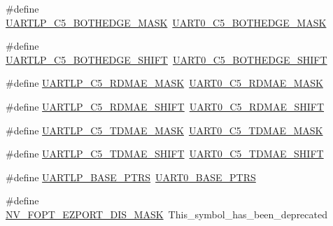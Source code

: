 \begin{DoxyCompactItemize}
\item 
\#define \hyperlink{group___backward___compatibility___symbols_ga6b248448b3fc7bf345c7a75bec3b8aa3}{U\+A\+R\+T\+L\+P\+\_\+\+C5\+\_\+\+B\+O\+T\+H\+E\+D\+G\+E\+\_\+\+M\+A\+SK}~\hyperlink{group___u_a_r_t0___register___masks_gaa34159b3052095ce96fa50cc6183de77}{U\+A\+R\+T0\+\_\+\+C5\+\_\+\+B\+O\+T\+H\+E\+D\+G\+E\+\_\+\+M\+A\+SK}
\item 
\#define \hyperlink{group___backward___compatibility___symbols_gac6b4dfae8e6dc532807323db5e2e489c}{U\+A\+R\+T\+L\+P\+\_\+\+C5\+\_\+\+B\+O\+T\+H\+E\+D\+G\+E\+\_\+\+S\+H\+I\+FT}~\hyperlink{group___u_a_r_t0___register___masks_ga7d1df71b9671df4f50ecb6c1e1518731}{U\+A\+R\+T0\+\_\+\+C5\+\_\+\+B\+O\+T\+H\+E\+D\+G\+E\+\_\+\+S\+H\+I\+FT}
\item 
\#define \hyperlink{group___backward___compatibility___symbols_ga8b81dfd26f766f55a3c80110e5439652}{U\+A\+R\+T\+L\+P\+\_\+\+C5\+\_\+\+R\+D\+M\+A\+E\+\_\+\+M\+A\+SK}~\hyperlink{group___u_a_r_t0___register___masks_ga75704957ea817d0ea4ef69975008dae1}{U\+A\+R\+T0\+\_\+\+C5\+\_\+\+R\+D\+M\+A\+E\+\_\+\+M\+A\+SK}
\item 
\#define \hyperlink{group___backward___compatibility___symbols_gabf5bb3ff2b944bfdbfd8b05f29c7b678}{U\+A\+R\+T\+L\+P\+\_\+\+C5\+\_\+\+R\+D\+M\+A\+E\+\_\+\+S\+H\+I\+FT}~\hyperlink{group___u_a_r_t0___register___masks_ga5074684d000e97fb534e7e1dc22ea172}{U\+A\+R\+T0\+\_\+\+C5\+\_\+\+R\+D\+M\+A\+E\+\_\+\+S\+H\+I\+FT}
\item 
\#define \hyperlink{group___backward___compatibility___symbols_ga7846766b042194a47ed511aa4114210e}{U\+A\+R\+T\+L\+P\+\_\+\+C5\+\_\+\+T\+D\+M\+A\+E\+\_\+\+M\+A\+SK}~\hyperlink{group___u_a_r_t0___register___masks_ga02899afc667f46e4beecd75e31b0fa90}{U\+A\+R\+T0\+\_\+\+C5\+\_\+\+T\+D\+M\+A\+E\+\_\+\+M\+A\+SK}
\item 
\#define \hyperlink{group___backward___compatibility___symbols_gac2909b753be3968e0878180017501e56}{U\+A\+R\+T\+L\+P\+\_\+\+C5\+\_\+\+T\+D\+M\+A\+E\+\_\+\+S\+H\+I\+FT}~\hyperlink{group___u_a_r_t0___register___masks_ga932dfb6ee4de4ff77a7a7d3154718286}{U\+A\+R\+T0\+\_\+\+C5\+\_\+\+T\+D\+M\+A\+E\+\_\+\+S\+H\+I\+FT}
\item 
\#define \hyperlink{group___backward___compatibility___symbols_ga1913c55fe9312bdb0414edc7553329f3}{U\+A\+R\+T\+L\+P\+\_\+\+B\+A\+S\+E\+\_\+\+P\+T\+RS}~\hyperlink{group___u_a_r_t0___peripheral_ga9416d89d2bc04eb37311da5910f1c701}{U\+A\+R\+T0\+\_\+\+B\+A\+S\+E\+\_\+\+P\+T\+RS}
\item 
\#define \hyperlink{group___backward___compatibility___symbols_ga5c130a6f11de9f04a77b36fd61843e8f}{N\+V\+\_\+\+F\+O\+P\+T\+\_\+\+E\+Z\+P\+O\+R\+T\+\_\+\+D\+I\+S\+\_\+\+M\+A\+SK}~This\+\_\+symbol\+\_\+has\+\_\+been\+\_\+deprecated

\end{DoxyCompactItemize}
